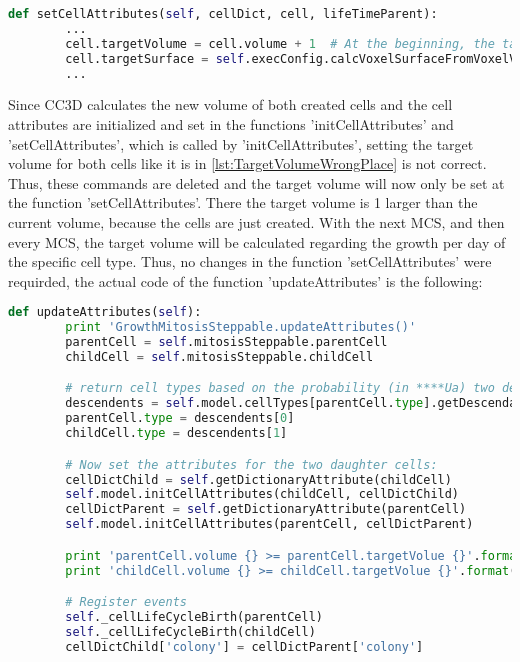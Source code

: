 \begin{lstlisting}[language=Python, caption=set the target volume as well as the target surface in the intended function]
    def setCellAttributes(self, cellDict, cell, lifeTimeParent):
		...
        cell.targetVolume = cell.volume + 1  # At the beginning, the target is the actual size.
        cell.targetSurface = self.execConfig.calcVoxelSurfaceFromVoxelVolume(cell.targetVolume)
        ...
\end{lstlisting}
Since \ac{CC3D} calculates the new volume of both created cells and the cell attributes are initialized and set in the functions 'initCellAttributes' and 'setCellAttributes', which is called by 'initCellAttributes', setting the target volume for both cells like it is in \ref{lst:TargetVolumeWrongPlace} is not correct. Thus, these commands are deleted and the target volume will now only be set at the function 'setCellAttributes'. There the target volume is 1 larger than the current volume, because the cells are just created. With the next \ac{MCS}, and then every \ac{MCS}, the target volume will be calculated regarding the growth per day of the specific cell type. Thus, no changes in the function 'setCellAttributes' were requirded, the actual code of the function 'updateAttributes' is the following:

\begin{lstlisting}[language=Python, caption = two cells are created\, due to mitosis]
    def updateAttributes(self):
        print 'GrowthMitosisSteppable.updateAttributes()'
        parentCell = self.mitosisSteppable.parentCell
        childCell = self.mitosisSteppable.childCell

        # return cell types based on the probability (in ****Ua) two descendents of the current cell
        descendents = self.model.cellTypes[parentCell.type].getDescendants()
        parentCell.type = descendents[0]
        childCell.type = descendents[1]

        # Now set the attributes for the two daughter cells:
        cellDictChild = self.getDictionaryAttribute(childCell)
        self.model.initCellAttributes(childCell, cellDictChild)
        cellDictParent = self.getDictionaryAttribute(parentCell)
        self.model.initCellAttributes(parentCell, cellDictParent)

        print 'parentCell.volume {} >= parentCell.targetVolue {}'.format(parentCell.volume, parentCell.targetVolume)
        print 'childCell.volume {} >= childCell.targetVolue {}'.format(childCell.volume, childCell.targetVolume)

        # Register events
        self._cellLifeCycleBirth(parentCell)
        self._cellLifeCycleBirth(childCell)
        cellDictChild['colony'] = cellDictParent['colony']
\end{lstlisting}























